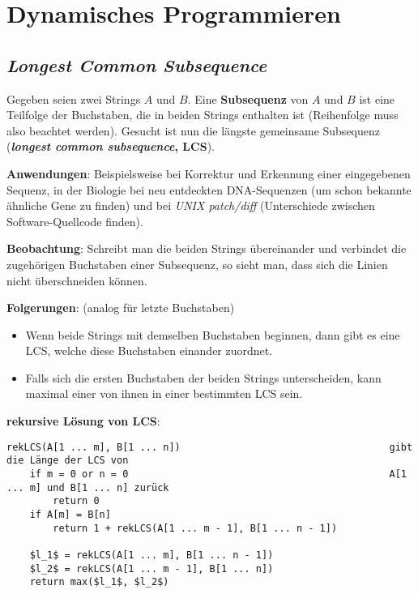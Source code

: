 \chapter{%
    Dynamisches Programmieren%
}

\section{%
    \emph{Longest Common Subsequence}%
}

Gegeben seien zwei Strings $A$ und $B$.
Eine \textbf{Subsequenz} von $A$ und $B$ ist eine Teilfolge der Buchstaben, die
in beiden Strings enthalten ist (Reihenfolge muss also beachtet werden).
Gesucht ist nun die längste gemeinsame Subsequenz
(\textbf{\emph{longest common subsequence}, LCS}).

\textbf{Anwendungen}:
Beispielsweise bei Korrektur und Erkennung einer eingegebenen Sequenz,
in der Biologie bei neu entdeckten DNA-Sequenzen (um schon bekannte ähnliche
Gene zu finden) und bei \emph{UNIX patch/diff}
(Unterschiede zwischen Software-Quellcode finden).

\linie

\textbf{Beobachtung}:
Schreibt man die beiden Strings übereinander und verbindet die zugehörigen
Buchstaben einer Subsequenz, so sieht man, dass sich die Linien nicht
überschneiden können.

\textbf{Folgerungen}:
(analog für letzte Buchstaben)
\begin{itemize}
    \item
    Wenn beide Strings mit demselben Buchstaben beginnen, dann gibt es eine
    LCS, welche diese Buchstaben einander zuordnet.

    \item
    Falls sich die ersten Buchstaben der beiden Strings unterscheiden,
    kann maximal einer von ihnen in einer bestimmten LCS sein.
\end{itemize}

\linie

\textbf{rekursive Lösung von LCS}:
\begin{lstlisting}
rekLCS(A[1 ... m], B[1 ... n])                                    gibt die Länge der LCS von
    if m = 0 or n = 0                                             A[1 ... m] und B[1 ... n] zurück
        return 0
    if A[m] = B[n]
        return 1 + rekLCS(A[1 ... m - 1], B[1 ... n - 1])

    $l_1$ = rekLCS(A[1 ... m], B[1 ... n - 1])
    $l_2$ = rekLCS(A[1 ... m - 1], B[1 ... n])
    return max($l_1$, $l_2$)
\end{lstlisting}

